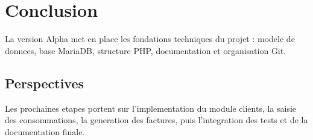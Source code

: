 \section{Conclusion}

La version Alpha met en place les fondations techniques du projet : modele de donnees, base MariaDB, structure PHP, documentation et organisation Git.

\subsection{Perspectives}

Les prochaines etapes portent sur l'implementation du module clients, la saisie des consommations, la generation des factures, puis l'integration des tests et de la documentation finale.

